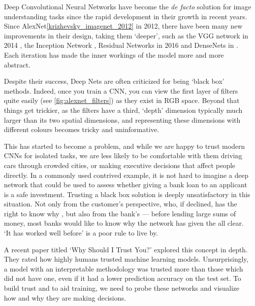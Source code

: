Deep Convolutional Neural Networks have become the \emph{de facto} solution for
image understanding tasks since the rapid development in their growth in recent
years. Since AlexNet\autoref{krizhevsky_imagenet_2012} in 2012, there have been
many new improvements in their design, taking them `deeper', such as the
VGG network in 2014 \cite{simonyan_very_2014}, the Inception Network
\cite{szegedy_going_2015}, Residual Networks in 2016
\cite{he_deep_2016} and DenseNets in \cite{huang_densely_2017}. Each iteration
has made the inner workings of the model more and more abstract.

Despite their success, Deep Nets are often criticized for being `black box'
methods. Indeed, once you train a CNN, you can view the first layer of filters
quite easily (see \autoref{fig:alexnet_filters}) as they exist in RGB
space. Beyond that things get trickier, as the filters have a third, `depth'
dimension typically much larger than its two spatial dimensions, and
representing these dimensions with different colours becomes tricky and
uninformative.

This has started to become a problem, and while we are happy to trust modern
CNNs for isolated tasks, we are less likely to be comfortable with them driving
cars through crowded cities, or making executive decisions that affect people
directly. In a commonly used contrived example, it is not hard to imagine a deep
network that could be used to assess whether giving a bank loan to an applicant
is a safe investment. Trusting a black box solution is deeply unsatisfactory in
this situation. Not only from the customer's perspective, who, if declined, has
the right to know why \cite{goodman_european_2016}, but
also from the bank's --- before lending large sums of money, most banks
would like to know why the network has given the all clear. `It has worked well
before' is a poor rule to live by.

A recent paper titled `Why Should I Trust You?' \cite{ribeiro_why_2016}
explored this concept in depth. They rated how highly humans trusted machine
learning models. Unsurprisingly, a model with an interpretable methodology
was trusted more than those which did not have one, even if it had a lower
prediction accuracy on the test set. 
To build trust and to aid training, we need to probe these networks and
visualize how and why they are making decisions.


